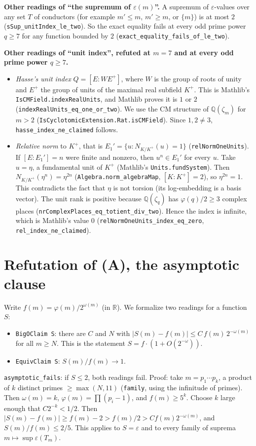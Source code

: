 \documentclass[11pt]{article}
\theoremstyle{definition}
\newcommand{\Q}{\mathbb{Q}}
\begin{document}
\textbf{Other readings of ``the supremum of $\varepsilon(m)$''.} A supremum of $\varepsilon$-values
over any set $T$ of conductors (for example $m'\le m$, $m'\ge m$, or $\{m\}$) is at most $2$
(\texttt{sSup\_unitIndex\_le\_two}). So the exact equality fails at every odd prime power $q\ge7$
for any function bounded by $2$ (\texttt{exact\_equality\_fails\_of\_le\_two}).

\textbf{Other readings of ``unit index'', refuted at $m=7$ and at every odd prime power $q\ge 7$.}
\begin{itemize}
\item \emph{Hasse's unit index} $Q=[E:WE^+]$, where $W$ is the group of roots of unity and $E^+$
the group of units of the maximal real subfield $K^+$. This is Mathlib's
\texttt{IsCMField.indexRealUnits}, and Mathlib proves it is $1$ or $2$
(\texttt{indexRealUnits\_eq\_one\_or\_two}). We use the CM structure of $\Q(\zeta_m)$ for $m>2$
(\texttt{IsCyclotomicExtension.Rat.isCMField}). Since $1,2\ne3$, \texttt{hasse\_index\_ne\_claimed}
follows.
\item \emph{Relative norm} to $K^+$, that is $E_1'=\{u: N_{K/K^+}(u)=1\}$
(\texttt{relNormOneUnits}). If $[E:E_1']=n$ were finite and nonzero, then $u^n\in E_1'$ for every
$u$. Take $u=\eta$, a fundamental unit of $K^+$ (Mathlib's \texttt{Units.fundSystem}). Then
$N_{K/K^+}(\eta^n)=\eta^{2n}$ (\texttt{Algebra.norm\_algebraMap}, $[K:K^+]=2$), so
$\eta^{2n}=1$. This contradicts the fact that $\eta$ is not torsion (its log-embedding is a
basis vector). The unit rank is positive because $\Q(\zeta_q)$ has $\varphi(q)/2\ge3$ complex
places (\texttt{nrComplexPlaces\_eq\_totient\_div\_two}). Hence the index is infinite, which is
Mathlib's value $0$ (\texttt{relNormOneUnits\_index\_eq\_zero}, \texttt{rel\_index\_ne\_claimed}).
\end{itemize}

\section{Refutation of (A), the asymptotic clause}

Write $f(m)=\varphi(m)/2^{\omega(m)}$ (in $\mathbb{R}$). We formalize two readings for a function
$S$:
\begin{itemize}
\item \texttt{BigOClaim S}: there are $C$ and $N$ with
$|S(m)-f(m)|\le C\,f(m)\,2^{-\omega(m)}$ for all $m\ge N$. This is the statement
$S=f\cdot(1+O(2^{-\omega}))$.
\item \texttt{EquivClaim S}: $S(m)/f(m)\to1$.
\end{itemize}
\texttt{asymptotic\_fails}: if $S\le2$, both readings fail. Proof: take $m=p_1\cdots p_k$, a
product of $k$ distinct primes $\ge\max(N,11)$ (\texttt{family}, using the infinitude of primes).
Then $\omega(m)=k$, $\varphi(m)=\prod(p_i-1)$, and $f(m)\ge5^k$. Choose $k$ large enough that
$C2^{-k}<1/2$. Then $|S(m)-f(m)|\ge f(m)-2>f(m)/2>C f(m)2^{-\omega(m)}$, and $S(m)/f(m)\le 2/5$.
This applies to $S=\varepsilon$ and to every family of suprema $m\mapsto\sup\varepsilon(T_m)$.
\end{document}
